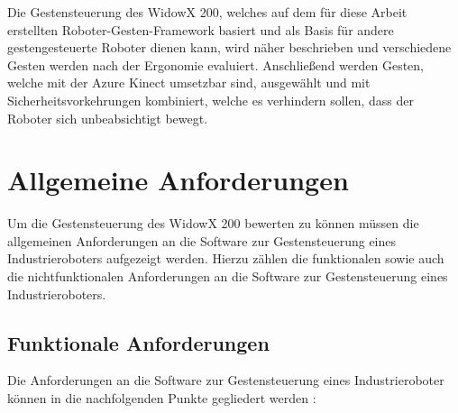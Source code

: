 Die Gestensteuerung des WidowX 200, welches auf dem für diese Arbeit erstellten Roboter-Gesten-Framework basiert und als Basis für andere gestengesteuerte Roboter dienen kann, wird näher beschrieben und verschiedene Gesten werden nach der Ergonomie evaluiert. Anschließend werden Gesten, welche mit der Azure Kinect umsetzbar sind, ausgewählt und mit Sicherheitsvorkehrungen kombiniert, welche es verhindern sollen, dass der Roboter sich unbeabsichtigt bewegt.

\section{Allgemeine Anforderungen}
Um die Gestensteuerung des WidowX 200 bewerten zu können müssen die allgemeinen Anforderungen an die Software zur Gestensteuerung eines Industrieroboters aufgezeigt werden. Hierzu zählen die funktionalen sowie auch die nichtfunktionalen Anforderungen an die Software zur Gestensteuerung eines Industrieroboters.

\subsection{Funktionale Anforderungen}
Die Anforderungen an die Software zur Gestensteuerung eines Industrieroboter können in die nachfolgenden Punkte gegliedert werden \cite{kircher_it_2006} \cite[2\psq]{brauer_gestenerkennung_nodate}:\\

